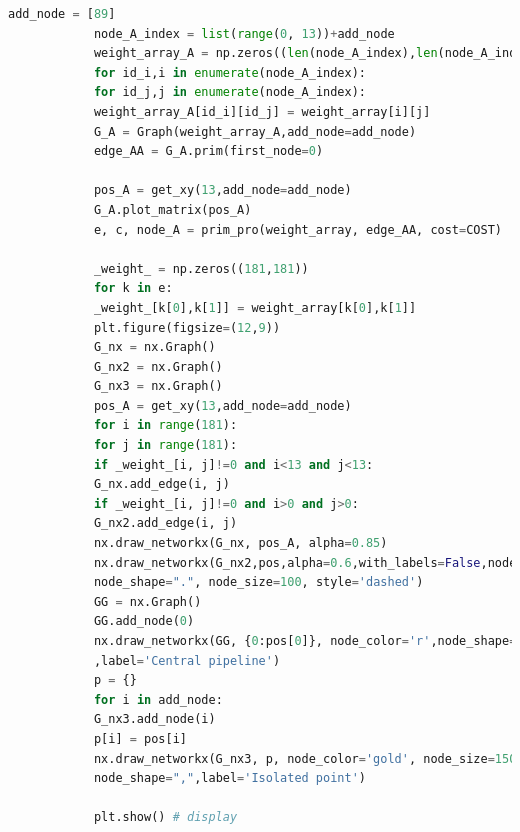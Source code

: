 \documentclass{whutmod}
\begin{document}
\begin{lstlisting}[language=python]
			add_node = [89]
			node_A_index = list(range(0, 13))+add_node
			weight_array_A = np.zeros((len(node_A_index),len(node_A_index)))
			for id_i,i in enumerate(node_A_index):
			for id_j,j in enumerate(node_A_index):
			weight_array_A[id_i][id_j] = weight_array[i][j]
			G_A = Graph(weight_array_A,add_node=add_node)
			edge_AA = G_A.prim(first_node=0)
			
			pos_A = get_xy(13,add_node=add_node)
			G_A.plot_matrix(pos_A)
			e, c, node_A = prim_pro(weight_array, edge_AA, cost=COST)
			
			_weight_ = np.zeros((181,181))
			for k in e:
			_weight_[k[0],k[1]] = weight_array[k[0],k[1]]
			plt.figure(figsize=(12,9)) 
			G_nx = nx.Graph()
			G_nx2 = nx.Graph()
			G_nx3 = nx.Graph()
			pos_A = get_xy(13,add_node=add_node)
			for i in range(181):
			for j in range(181):
			if _weight_[i, j]!=0 and i<13 and j<13:
			G_nx.add_edge(i, j)
			if _weight_[i, j]!=0 and i>0 and j>0:
			G_nx2.add_edge(i, j)
			nx.draw_networkx(G_nx, pos_A, alpha=0.85)
			nx.draw_networkx(G_nx2,pos,alpha=0.6,with_labels=False,node_color='slateblue',
			node_shape=".", node_size=100, style='dashed')
			GG = nx.Graph()
			GG.add_node(0)
			nx.draw_networkx(GG, {0:pos[0]}, node_color='r',node_shape='*', node_size=1200
			,label='Central pipeline')
			p = {}
			for i in add_node:
			G_nx3.add_node(i)
			p[i] = pos[i]
			nx.draw_networkx(G_nx3, p, node_color='gold', node_size=150,with_labels=False,
			node_shape=",",label='Isolated point')
			
			plt.show() # display
			\end{lstlisting}
\end{document}
